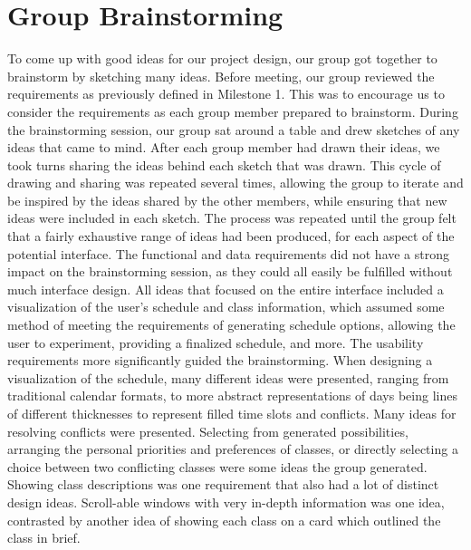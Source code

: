 \documentclass{article}
\begin{document}
\section{Group Brainstorming}
To come up with good ideas for our project design, our group got together to brainstorm by sketching many ideas. Before meeting, our group reviewed the requirements as previously defined in Milestone 1. This was to encourage us to consider the requirements as each group member prepared to brainstorm.
\newline
\newline
During the brainstorming session, our group sat around a table and drew sketches of any ideas that came to mind. After each group member had drawn their ideas, we took turns sharing the ideas behind each sketch that was drawn. This cycle of drawing and sharing was repeated several times, allowing the group to iterate and be inspired by the ideas shared by the other members, while ensuring that new ideas were included in each sketch. The process was repeated until the group felt that a fairly exhaustive range of ideas had been produced, for each aspect of the potential interface.
\newline
\newline
The functional and data requirements did not have a strong impact on the brainstorming session, as they could all easily be fulfilled without much interface design. All ideas that focused on the entire interface included a visualization of the user's schedule and class information, which assumed some method of meeting the requirements of generating schedule options, allowing the user to experiment, providing a finalized schedule, and more. The usability requirements more significantly guided the brainstorming. When designing a visualization of the schedule, many different ideas were presented, ranging from traditional calendar formats, to more abstract representations of days being lines of different thicknesses to represent filled time slots and conflicts. Many ideas for resolving conflicts were presented. Selecting from generated possibilities, arranging the personal priorities and preferences of classes, or directly selecting a choice between two conflicting classes were some ideas the group generated. Showing class descriptions was one requirement that also had a lot of distinct design ideas. Scroll-able windows with very in-depth information was one idea, contrasted by another idea of showing each class on a card which outlined the class in brief. 
\newline
\end{document}
